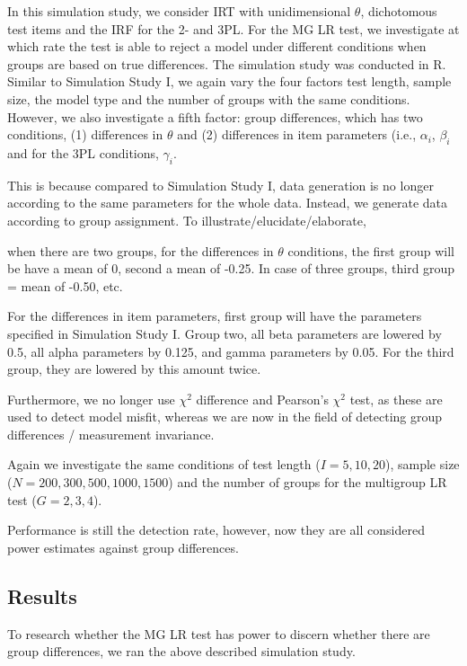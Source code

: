 \documentclass[Royal,sageapa,times,doublespace]{sagej}
\begin{document}
In this simulation study, we consider IRT with unidimensional $\theta$, dichotomous test items and the IRF for the 2- and 3PL. For the MG LR test, we investigate at which rate the test is able to reject a model under different conditions when groups are based on true differences. The simulation study was conducted in R. \\
\indent Similar to Simulation Study I, we again vary the four factors test length, sample size, the model type and the number of groups with the same conditions. However, we also investigate a fifth factor: group differences, which has two conditions, (1) differences in $\theta$ and (2) differences in item parameters (i.e., $\alpha_i$, $\beta_i$ and for the 3PL conditions, $\gamma_i$. 

This is because compared to Simulation Study I, data generation is no longer according to the same parameters for the whole data. Instead, we generate data according to group assignment. To illustrate/elucidate/elaborate, 

when there are two groups, for the differences in $\theta$ conditions, the first group will be  have a mean of 0, second a mean of -0.25. In case of three groups, third group = mean of -0.50, etc.

For the differences in item parameters, first group will have the parameters specified in Simulation Study I. Group two, all beta parameters are lowered by 0.5, all alpha parameters by 0.125, and gamma parameters by 0.05. For the third group, they are lowered by this amount twice.

Furthermore, we no longer use $\chi^2$ difference and Pearson's $\chi^2$ test, as these are used to detect model misfit, whereas we are now in the field of detecting group differences / measurement invariance.



Again we investigate the same conditions of test length ($I = 5, 10, 20$), sample size ($N = 200, 300, 500, 1000, 1500$) and the number of groups for the multigroup LR test ($G = 2, 3, 4$). 

Performance is still the detection rate, however, now they are all considered power estimates against group differences.

\subsection{Results}

To research whether the MG LR test has power to discern whether there are group differences, we ran the above described simulation study. 
\end{document}

